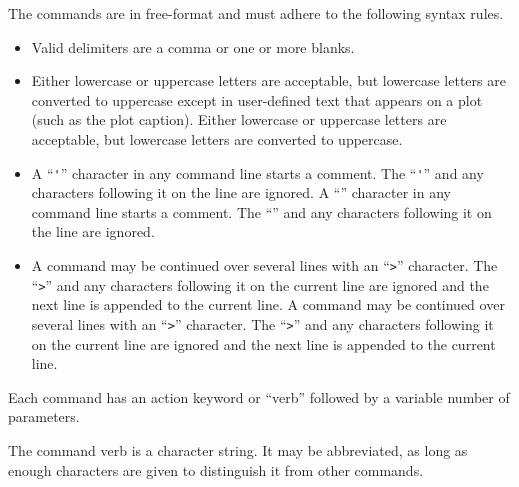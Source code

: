 The commands are in free-format and must adhere to the following syntax
rules.
\setlength{\itemsep}{\medskipamount} \begin{itemize}
\item
Valid delimiters are a comma or one or more blanks.
\item
\ifx\PROGRAM\BLOT
Either lowercase or uppercase letters are acceptable, but lowercase
letters are converted to uppercase except in user-defined text that
appears on a plot (such as the plot caption).
\else
Either lowercase or uppercase letters are acceptable, but lowercase
letters are converted to uppercase.
\fi
\item
\ifx\PROGRAM\ALGEBRA
A ``\verb|'|'' character in any command line starts a comment. The
``\verb|'|'' and any characters following it on the line are ignored.
\else
A ``\cmd{\$}'' character in any command line starts a comment. The
``\cmd{\$}'' and any characters following it on the line are ignored.
\fi
\item
\ifx\PROGRAM\ALGEBRA
A command may be continued over several lines with an ``\verb|>|''
character. The ``\verb|>|'' and any characters following it on the
current line are ignored and the next line is appended to the current
line.
\else
A command may be continued over several lines with an ``\verb|>|''
character. The ``\verb|>|'' and any characters following it on the
current line are ignored and the next line is appended to the current
line.
\fi
\end{itemize}

Each command has an action keyword or ``verb'' followed by a variable
number of parameters.

The command verb is a character string. It may be abbreviated, as long
as enough characters are given to distinguish it from other commands.

